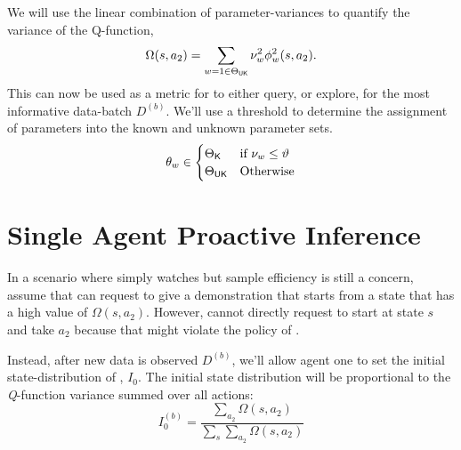 We will use the linear combination of parameter-variances to quantify the variance of the Q-function,
\begin{equation}\label{eq:state_action_uncertainty}
\Omega(s,a_2)=\sum_{w=1 \in \Theta_{\mathsf{UK}}} \nu_w^2 \phi_w^2(s,a_2).
\end{equation}
This can now be used as a metric for  to either query, or explore, for the most informative data-batch
$D^{(b)}$. We'll use a threshold to determine the assignment of parameters into the known and unknown parameter sets.
\begin{equation*}
        \paramElem \in \begin{cases}
                                        \Theta_{\known} & \text{if}\ \nu_w \leq \vartheta \\
                                        \Theta_{\unknown} & \text{Otherwise} \\
                                        \end{cases}
\end{equation*}


\section{Single Agent Proactive Inference}
In a scenario where  simply watches  but sample efficiency is still a concern, assume that 
can request  to give a demonstration that starts from a state that has a high value of $\Omega(s,a_2)$.
However,  cannot directly request  to start at state $s$ and take $a_2$ because that might violate the
policy of .

Instead, after new data is observed $D^{(b)}$, we'll allow agent one to set the initial state-distribution of ,
$I_0$. The initial state distribution will be proportional to the \emph{Q}-function variance summed over all actions:
\begin{equation}\label{eq:active_initial_set}
I_0^{(b)} = \frac{\sum_{a_2} \Omega(s,a_2)}{\sum_s \sum_{a_2} \Omega(s,a_2)}
\end{equation}

